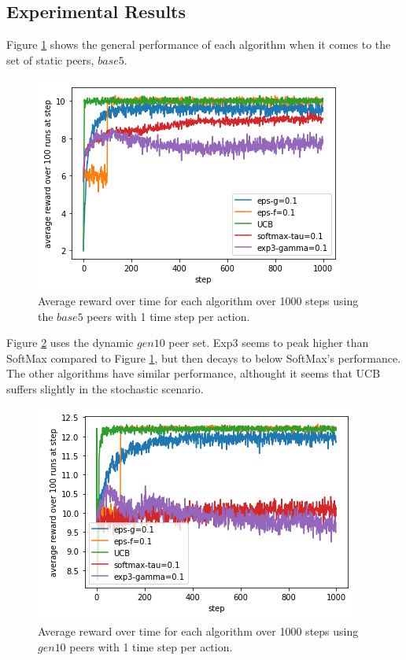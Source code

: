 \documentclass{article}
\begin{document}
\subsection{Experimental Results} 

Figure \ref{fig:base5_1ts_1000step_5algos} shows the general performance of each algorithm when it comes to the set of static peers, $base5$.
\begin{figure}[h]
    \centering
    \includegraphics[width=1\linewidth]{figs/base5_1ts_1000step_5algos.png}
    \caption{Average reward over time for each algorithm over 1000 steps using the $base5$ peers with 1 time step per action.}
    \label{fig:base5_1ts_1000step_5algos}
\end{figure}

Figure \ref{fig:gen10_1ts_1000step_5algos} uses the dynamic $gen10$ peer set. Exp3 seems to peak higher than SoftMax compared to Figure \ref{fig:base5_1ts_1000step_5algos}, 
but then decays to below SoftMax's performance. The other algorithms have similar performance, althought it seems that UCB suffers slightly in the stochastic scenario. 
\begin{figure}[h]
    \centering
    \includegraphics[width=1\linewidth]{figs/gen10_1ts_1000step_5algos.png}
    \caption{Average reward over time for each algorithm over 1000 steps using $gen10$ peers with 1 time step per action.}
    \label{fig:gen10_1ts_1000step_5algos}
\end{figure}
\end{document}
